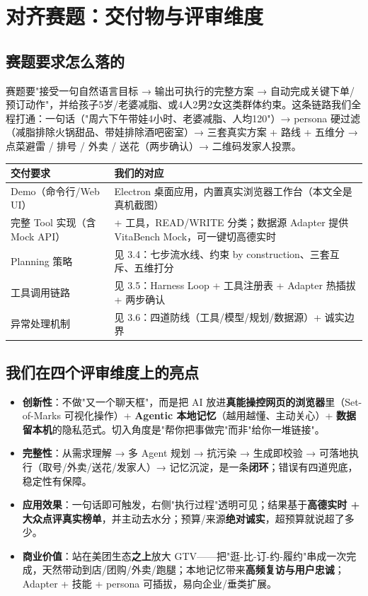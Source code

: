 \documentclass[11pt,a4paper]{ctexart}
\begin{document}
\section{对齐赛题：交付物与评审维度}

\subsection{赛题要求怎么落的}
赛题要"接受一句自然语言目标 → 输出可执行的完整方案 → 自动完成关键下单/预订动作"，并给孩子5岁/老婆减脂、或4人2男2女这类群体约束。这条链路我们全程打通：一句话（"周六下午带娃4小时、老婆减脂、人均120"）→ persona 硬过滤（减脂排除火锅甜品、带娃排除酒吧密室）→ 三套真实方案 + 路线 + 五维分 → 点菜避雷 / 排号 / 外卖 / 送花（两步确认）→ 二维码发家人投票。

\begin{center}
{\small
\begin{tabularx}{\linewidth}{>{\raggedright\arraybackslash}p{4.6cm} >{\raggedright\arraybackslash}X}
\toprule
\textbf{交付要求} & \textbf{我们的对应} \\
\midrule
Demo（命令行/Web UI） & Electron 桌面应用，内置真实浏览器工作台（本文全是真机截图） \\
完整 Tool 实现（含 Mock API） & 20+ 工具，READ/WRITE 分类；数据源 Adapter 提供 VitaBench Mock，可一键切高德实时 \\
Planning 策略 & 见 3.4：七步流水线、约束 by construction、三套互斥、五维打分 \\
工具调用链路 & 见 3.5：Harness Loop + 工具注册表 + Adapter 热插拔 + 两步确认 \\
异常处理机制 & 见 3.6：四道防线（工具/模型/规划/数据源）+ 诚实边界 \\
\bottomrule
\end{tabularx}}
\end{center}

\subsection{我们在四个评审维度上的亮点}
\begin{itemize}[leftmargin=1.3em,itemsep=1.5pt]
  \item \textbf{创新性}：不做"又一个聊天框"，而是把 AI 放进\textbf{真能操控网页的浏览器}里（Set-of-Marks 可视化操作）+ \textbf{Agentic 本地记忆}（越用越懂、主动关心）+ \textbf{数据留本机}的隐私范式。切入角度是"帮你把事做完"而非"给你一堆链接"。
  \item \textbf{完整性}：从需求理解 → 多 Agent 规划 → 抗污染 → 生成即校验 → 可落地执行（取号/外卖/送花/发家人）→ 记忆沉淀，是一条\textbf{闭环}；错误有四道兜底，稳定性有保障。
  \item \textbf{应用效果}：一句话即可触发，右侧"执行过程"透明可见；结果基于\textbf{高德实时 + 大众点评真实榜单}，并主动去水分；预算/来源\textbf{绝对诚实}，超预算就说超了多少。
  \item \textbf{商业价值}：站在美团生态\textbf{之上}放大 GTV——把"逛-比-订-约-履约"串成一次完成，天然带动到店/团购/外卖/跑腿；本地记忆带来\textbf{高频复访与用户忠诚}；Adapter + 技能 + persona 可插拔，易向企业/垂类扩展。
\end{itemize}
\end{document}

